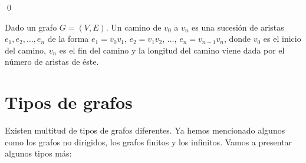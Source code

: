 \qed

\begin{defi} 
	Dado un grafo $G=(V,E)$. Un camino de $v_{0}$ a $v_{n}$ es una sucesión de aristas $e_{1},e_{2},\dots,e_{n}$ de la forma $e_{1}=v_{0}v_{1}$, $e_{2}=v_{1}v_{2}$, $\dots$, $e_{n}=v_{n-1}v_{n}$, donde $v_{0}$ es el inicio del camino, $v_{n}$ es el fin del camino y la longitud del camino viene dada por el número de aristas de éste.
\end{defi}

\section{Tipos de grafos}

Existen multitud de tipos de grafos diferentes. Ya hemos mencionado algunos como los grafos no dirigidos, los grafos finitos y los infinitos. Vamos a presentar algunos tipos más:
